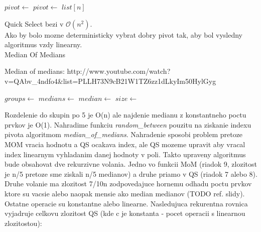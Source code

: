 \documentclass[paper=a4, fontsize=11pt]{scrartcl} %
\numberwithin{equation}{section} %
\numberwithin{figure}{section} %
\numberwithin{table}{section} %
\begin{document}
\begin{algorithmic}[1]
       	\State $pivot \gets$ 
        \State $pivot \gets$ 
            \State \Return $list[n]$
            \State \Return {}
        \Else
            \State \Return {}
        \EndIf
    \EndFunction
\end{algorithmic}

Quick Select bezi v $\mathcal{O}(n^2)$. \\

Ako by bolo mozne deterministicky vybrat dobry pivot tak, aby bol vysledny algoritmus vzdy linearny.\\

Median Of Medians

Median of medians: http://www.youtube.com/watch?v=QAbv\_4ndfo4\&list=PLLH73N9cB21W1TZ6zz1dLkyIm50HylGyg \\

\begin{algorithmic}[1]
        \State $groups \gets$ 
        \State $medians \gets$ 
            \State $median \gets$ 
            \State {}
        \EndFor
       \State $size \gets$ 
       \State \Return {}
    \EndFunction
\end{algorithmic}

Rozdelenie do skupin po 5 je O(n) ale najdenie medianu z konstantneho poctu prvkov je O(1).
Nahradime funkciu {\em random\_between} pouzitu na ziskanie indexu pivota algoritmom {\em median\_of\_medians}. Nahradenie sposobi problem pretoze MOM vracia hodnotu a QS ocakava index, ale QS mozeme upravit aby vracal index linearnym vyhladanim danej hodnoty v poli. Takto upraveny algoritmus bude obsahovat dve rekurzivne volania. Jedno vo funkcii MoM (riadok 9, zlozitost je n/5 pretoze sme ziskali n/5 medianov) a druhe priamo v QS (riadok 7 alebo 8). Druhe volanie ma zlozitost 7/10n zodpovedajuce hornemu odhadu poctu prvkov ktore su vacsie alebo naopak mensie ako median medianov (TODO ref. slidy). Ostatne operacie su konstantne alebo linearne.
Nasledujuca rekurentna rovnica vyjadruje celkovu zlozitost QS (kde c je konstanta - pocet operacii s linearnou zlozitostou):
\end{document}
